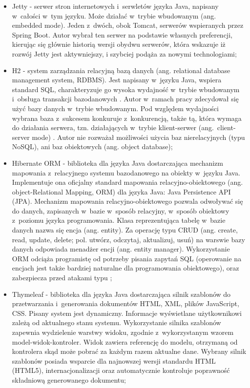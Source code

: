 \begin{itemize}
\medskip
\item Jetty - serwer stron internetowych i~serwletów języka Java, napisany w~całości w~tym języku. Może działać w~trybie wbudowanym (ang. embedded mode). Jeden z~dwóch, obok Tomcat, serwerów wspieranych przez Spring Boot. Autor wybrał ten serwer na podstawie własnych preferencji, kierując się głównie historią wersji obydwu serwerów, która wskazuje iż rozwój Jetty jest aktywniejszy, i szybciej podąża za nowymi technologiami;

\medskip
\item H2 - system zarządzania relacyjną bazą danych (ang. relational database management system, RDBMS). Jest napisany w~języku Java, wspiera standard SQL, charakteryzuje go wysoka wydajność w~trybie wbudowanym i~obsługa transakcji bazodanowych \cite{H2Performance}. Autor w~ramach pracy zdecydował się użyć bazy danych w~trybie wbudowanym. Pod względem wydajności wybrana baza z~sukcesem konkuruje z~konkurencją, także tą, która wymaga do działania serwera, tzn. działających w~trybie klient-serwer (ang.~client-server mode) \cite{H2Performance}. Autor nie rozważał możliwości użycia baz nierelacyjnych (typu NoSQL), ani baz obiektowych (ang. object database);

\medskip
\item Hibernate ORM - biblioteka dla języka Java dostarczająca mechanizm mapowania z~relacyjnego systemu bazodanowego na obiekty w~języku Java. Implementuje ona oficjalny standard mapowania relacyjno-obiektowego (ang. object-Relational Mapping, ORM) dla języka Java: Java Persistence API (JPA). Mechanizm mapowania relacyjno-obiektowego pozwala odwoływać się do danych, zapisanych w~bazie w~sposób relacyjny, w~sposób obiektowy z~poziomu języka programowania. Klasa reprezentująca tabelę w~bazie danych nazwa się encja (ang. entity). Za operację typu CRUD (ang. create, read, update, delete; pol. utwórz, odczytaj, aktualizuj, usuń) na warswie bazy danych odpowiada menadżer encji (ang. entity manager). Wykorzystanie ORM odciąża programistę od potrzeby pisania zapytań SQL (operowanie na encjach jest także bardziej naturalne dla programowania obiektowego), oraz zabezpiecza przed atakami typu ;

\medskip
\item Thymeleaf - biblioteka dla języka Java dostarczająca silnik szablonów do przetwarzania i~generowania dokumentów HTML, XML, plików JavaScript, CSS. Pisany system jest dynamiczny. Informacje wyświetlane użytkownikowi zależą od aktualnego stanu systemu. Wykorzystanie silnika szablonów zapewnia wydzielenie warstwy widoku, zgodnie z~wykorzystanym wzorem model-widok-kontroler. Widok zawiera referencję do modelu, otrzymaną od kontrolera skąd może pobrać za każdym razem aktualne dane. Wybrany silnik szablonów posiada wsparcie dla najnowszej wersji standardu HTML (HTML5), internacjonalizacji oraz automatycznie kontroluje poprawność składniową generowanego dokumentu;


\end{itemize}
